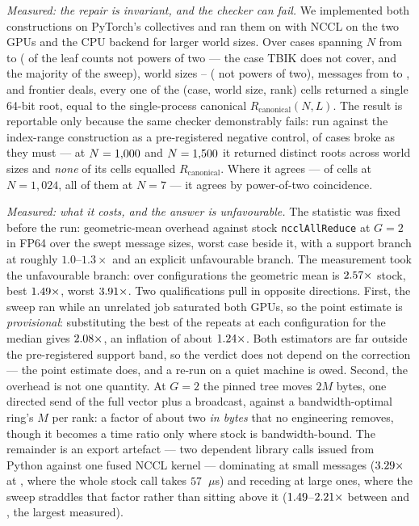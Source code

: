 \documentclass[journal,10pt]{IEEEtran}
\theoremstyle{plain}
\theoremstyle{definition}
\theoremstyle{remark}
\newcommand{\Rcan}{\ensuremath{R_{\mathrm{canonical}}}}
\begin{document}
\emph{Measured: the repair is invariant, and the checker can fail.} We
implemented both constructions on PyTorch's collectives and ran them on
\GpuHardware{} with NCCL on the two GPUs and the CPU backend for larger world
sizes. Over \PinCases{} cases spanning $N$ from \PinLeafLo{} to \PinLeafHi{}
(\PinNpowLeaf{} of the leaf counts not powers of two --- the case TBIK does
not cover, and the majority of the sweep), world sizes
\PinWorldLo{}--\PinWorldHi{} (\PinNpowWorld{} not powers of two), messages
from \PinMsgLo{} to \PinMsgHi{}, and \PinDeals{} frontier deals, every one of
the \PinCells{} (case, world size, rank) cells returned a single 64-bit root,
equal to the single-process canonical $\Rcan(N,L)$. The result is reportable
only because the same checker demonstrably fails: run against the index-range
construction as a pre-registered negative control, \PinNegFired{} of
\PinNegCases{} cases broke as they must --- at $N=1{,}000{}$ and
$N=1{,}500{}$ it returned \PinNegDistinct{} distinct roots across world
sizes \PinNegWorlds{} and \emph{none} of its \PinNegCells{} cells equalled
$\Rcan$. Where it agrees --- \PinNegPartial{} of \PinNegCells{} cells at
$N=1{,}024$, all of them at $N=7$ --- it agrees by power-of-two coincidence.


\emph{Measured: what it costs, and the answer is unfavourable.} The statistic
was fixed before the run: geometric-mean overhead against stock
\texttt{ncclAllReduce} at $G{=}2$ in FP64 over the swept message sizes, worst
case beside it, with a support branch at roughly $1.0$--$1.3\times$ and an
explicit unfavourable branch. The measurement took the unfavourable branch:
over \PinCostCells{} configurations the geometric mean is $2.57\times$
stock, best $1.49\times$, worst $3.91\times$. Two
qualifications pull in opposite directions. First, the sweep ran while an
unrelated job saturated both GPUs, so the point estimate is \emph{provisional}:
substituting the best of the repeats at each configuration for the median gives
$2.08\times$, an inflation of about $1.24\times$. Both
estimators are far outside the pre-registered support band, so the verdict does not
depend on the correction --- the point estimate does, and a re-run on a quiet
machine is owed. Second, the overhead is not one quantity. At $G{=}2$ the
pinned tree moves $2M$ bytes, one directed send of the full vector plus a
broadcast, against a bandwidth-optimal ring's $M$ per rank: a factor of about
two \emph{in bytes} that no engineering removes, though it becomes a time
ratio only where stock is bandwidth-bound. The remainder is an export artefact
--- two dependent library calls issued from Python against one fused NCCL
kernel --- dominating at small messages ($3.29\times$ at
\PinSmallSize{}, where the whole stock call takes $57$~$\mu$s) and
receding at large ones, where the sweep straddles that factor rather than
sitting above it ($1.49$--$2.21\times$ between
\PinLargeSizeLo{} and \PinBigSize{}, the largest measured).
\end{document}
